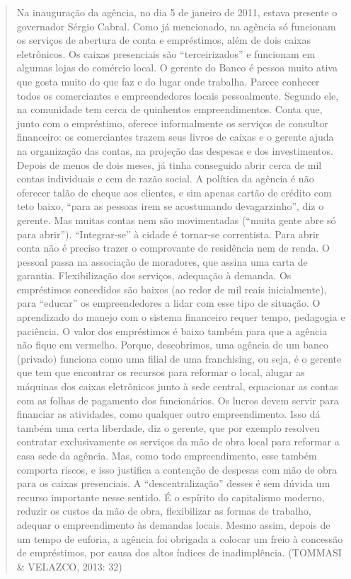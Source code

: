 \begin{quote}
Na inauguração da agência, no dia 5 de janeiro de 2011, estava presente
o governador Sérgio Cabral. Como já mencionado, na agência só funcionam
os serviços de abertura de conta e empréstimos, além de dois caixas
eletrônicos. Os caixas presenciais são ``terceirizados'' e funcionam em
algumas lojas do comércio local. O gerente do Banco é pessoa muito ativa
que gosta muito do que faz e do lugar onde trabalha. Parece conhecer
todos os comerciantes e empreendedores locais pessoalmente. Segundo ele,
na comunidade tem cerca de quinhentos empreendimentos. Conta que, junto
com o empréstimo, oferece informalmente os serviços de consultor
financeiro: os comerciantes trazem seus livros de caixas e o gerente
ajuda na organização das contas, na projeção das despesas e dos
investimentos. Depois de menos de dois meses, já tinha conseguido abrir
cerca de mil contas individuais e cem de razão social. A política da
agência é não oferecer talão de cheque aos clientes, e sim apenas cartão
de crédito com teto baixo, ``para as pessoas irem se acostumando
devagarzinho'', diz o gerente. Mas muitas contas nem são movimentadas
(``muita gente abre só para abrir''). ``Integrar-se'' à cidade é
tornar-se correntista. Para abrir conta não é preciso trazer o
comprovante de residência nem de renda. O pessoal passa na associação de
moradores, que assina uma carta de garantia. Flexibilização dos
serviços, adequação à demanda. Os empréstimos concedidos são baixos (ao
redor de mil reais inicialmente), para ``educar'' os empreendedores a
lidar com esse tipo de situação. O aprendizado do manejo com o sistema
financeiro requer tempo, pedagogia e paciência. O valor dos empréstimos
é baixo também para que a agência não fique em vermelho. Porque,
descobrimos, uma agência de um banco (privado) funciona como uma filial
de uma franchising, ou seja, é o gerente que tem que encontrar os
recursos para reformar o local, alugar as máquinas dos caixas
eletrônicos junto à sede central, equacionar as contas com as folhas de
pagamento dos funcionários. Os lucros devem servir para financiar as
atividades, como qualquer outro empreendimento. Isso dá também uma certa
liberdade, diz o gerente, que por exemplo resolveu contratar
exclusivamente os serviços da mão de obra local para reformar a casa
sede da agência. Mas, como todo empreendimento, esse também comporta
riscos, e isso justifica a contenção de despesas com mão de obra para os
caixas presenciais. A ``descentralização'' desses é sem dúvida um
recurso importante nesse sentido. É o espírito do capitalismo moderno,
reduzir os custos da mão de obra, flexibilizar as formas de trabalho,
adequar o empreendimento às demandas locais. Mesmo assim, depois de um
tempo de euforia, a agência foi obrigada a colocar um freio à concessão
de empréstimos, por causa dos altos índices de inadimplência. (TOMMASI
\& VELAZCO, 2013: 32)
\end{quote}

